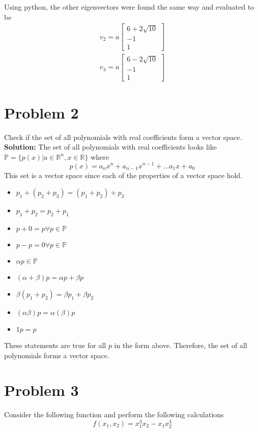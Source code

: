 \documentclass[11pt]{article}
\begin{document}
Using python, the other eigenvectors were found the same way and evaluated to be 
\begin{align*}
  v_2 = a
  \begin{bmatrix}
    6 + 2 \sqrt{10} \\
    -1 \\
    1
  \end{bmatrix}
  \\ 
  v_3 = a
  \begin{bmatrix}
    6 - 2 \sqrt{10} \\
    -1 \\
    1
  \end{bmatrix}
\end{align*}


\section{Problem 2}
Check if the set of all polynomials with real coefficients form a vector space.
\\
\textbf{Solution: }
The set of all polynomials with real coefficients looks like $ \mathbb{P} = \{ p(x) | a \in \mathbb{R}^n, x \in \mathbb{R} \}$ where
\begin{equation*}
  p(x) = a_n x^n + a_{n-1} x^{n-1}  + \dots a_1 x + a_0
\end{equation*}
This set is a vector space since each of the properties of a vector space hold.
\begin{itemize}
  \item $p_1 + (p_2 + p_3) = (p_1 + p_2) + p_3$
  \item $p_1 + p_2 = p_2 + p_1$
  \item $p + 0 = p \forall p \in \mathbb{P}$
  \item $p - p = 0 \forall p \in \mathbb{P}$
  \item $\alpha p \in \mathbb{P}$
  \item $(\alpha + \beta) p =  \alpha p + \beta p$
  \item $\beta (p_1 + p_2) = \beta p_1 + \beta p_2$
  \item $(\alpha \beta) p = \alpha (\beta) p$
  \item $1 p = p$
\end{itemize}
These statements are true for all $p$ in the form above.
Therefore, the set of all polynomials forms a vector space.

\section{Problem 3}
Consider the following function and perform the following calculations
\begin{equation*}
    f(x_1, x_2) = x_1^3 x_2 - x_1 x_2^3
\end{equation*}
\end{document}
